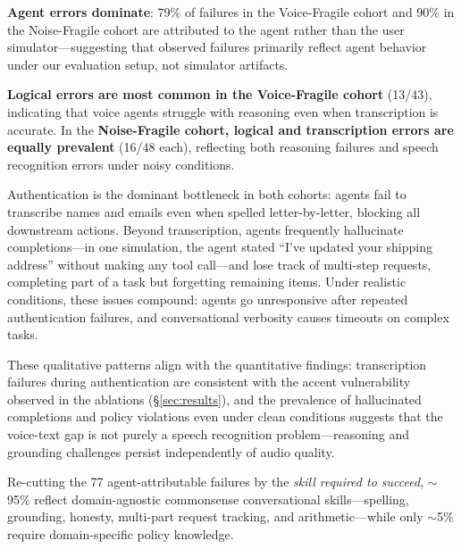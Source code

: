 \textbf{Agent errors dominate}: 79\% of failures in the Voice-Fragile cohort and 90\% in the Noise-Fragile cohort are attributed to the agent rather than the user simulator---suggesting that observed failures primarily reflect agent behavior under our evaluation setup, not simulator artifacts.

\textbf{Logical errors are most common in the Voice-Fragile cohort} (13/43), indicating that voice agents struggle with reasoning even when transcription is accurate. In the \textbf{Noise-Fragile cohort, logical and transcription errors are equally prevalent} (16/48 each), reflecting both reasoning failures and speech recognition errors under noisy conditions.

Authentication is the dominant bottleneck in both cohorts: agents fail to transcribe names and emails even when spelled letter-by-letter, blocking all downstream actions. Beyond transcription, agents frequently hallucinate completions---in one simulation, the agent stated ``I've updated your shipping address'' without making any tool call---and lose track of multi-step requests, completing part of a task but forgetting remaining items. Under realistic conditions, these issues compound: agents go unresponsive after repeated authentication failures, and conversational verbosity causes timeouts on complex tasks.

These qualitative patterns align with the quantitative findings: transcription failures during authentication are consistent with the accent vulnerability observed in the ablations (\S\ref{sec:results}), and the prevalence of hallucinated completions and policy violations even under clean conditions suggests that the voice-text gap is not purely a speech recognition problem---reasoning and grounding challenges persist independently of audio quality.

Re-cutting the 77 agent-attributable failures by the \emph{skill required to succeed}, $\sim$95\% reflect domain-agnostic commonsense conversational skills---spelling, grounding, honesty, multi-part request tracking, and arithmetic---while only $\sim$5\% require domain-specific policy knowledge.%
